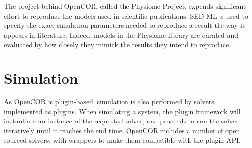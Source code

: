 \documentclass[\rootfolder/main.tex]{subfiles}
\begin{document}
The project behind OpenCOR, called the Physiome Project, expends significant effort to reproduce the models used in scientific publications.
SED-ML is used to specify the exact simulation parameters needed to reproduce a result the way it appears in literature.
Indeed, models in the Physiome library are curated and evaluated by how closely they mimick the results they intend to reproduce.

\section{Simulation}

As OpenCOR is plugin-based, simulation is also performed by solvers implemented as plugins.
When simulating a system, the plugin framework will instantiate an instance of the requested solver, and proceeds to run the solver iteratively until it reaches the end time.
OpenCOR includes a number of open sourced solvers, with wrappers to make them compatible with the plugin API.
\end{document}
